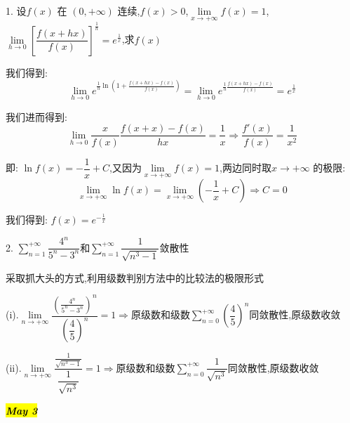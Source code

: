 1. 设$f(x)$ 在 $(0,+\infty)$ 连续,$f(x)>0$,$\lim\limits_{x\rightarrow  +\infty}f(x)=1$,$\lim\limits_{h\rightarrow 0}\left[\dfrac{f(x+hx)}{f(x)} \right]^{\frac{1}{h}}=e^{\frac{1}{x}} $,求$f(x)$
\begin{solution}
	
	我们得到: 
	$$\lim\limits_{h\rightarrow 0}e^{\frac{1}{h}\ln(1+\frac{f(x+hx)-f(x)}{f(x)})}=\lim\limits_{h\rightarrow 0}e^{\frac{1}{h}\frac{f(x+hx)-f(x)}{f(x)}}=e^{\frac{1}{x}}$$
	
	我们进而得到: 
	$$\lim\limits_{h\rightarrow 0}\frac{x}{f(x)}\frac{f(x+x)-f(x)}{hx}=\frac{1}{x}\Rightarrow \frac{f'(x)}{f(x)}=\frac{1}{x^2}$$
	
	即: $\ln f(x)=-\dfrac{1}{x}+C$,又因为$\lim\limits_{x\rightarrow  +\infty}f(x)=1$,两边同时取$x\rightarrow +\infty$ 的极限: 
	$$\lim\limits_{x\rightarrow +\infty}\ln f(x)=\lim\limits_{x\rightarrow +\infty}(-\frac{1}{x}+C)\Rightarrow C=0$$
	
	我们得到: $f(x)=e^{-\frac{1}{x}}$
\end{solution}

2. $\sum\limits_{n=1}^{+\infty}\dfrac{4^n}{5^n-3^n}$和$\sum\limits_{n=1}^{+\infty}\dfrac{1}{\sqrt{n^3-1}}$敛散性
\begin{solution}
	
	采取抓大头的方式,利用级数判别方法中的比较法的极限形式
	
	(i).$\lim\limits_{n\rightarrow+\infty}\dfrac{(\frac{4^n}{5^n-3^n})^n}{(\dfrac{4}{5})^n}=1\Rightarrow \text{原级数和级数}\sum\limits_{n=0}^{+\infty}(\dfrac{4}{5})^n\text{同敛散性}$,原级数收敛
	
	(ii).$\lim\limits_{n\rightarrow+\infty}\dfrac{\frac{1}{\sqrt{n^3-1}}}{\dfrac{1}{\sqrt{n^3}}}=1\Rightarrow \text{原级数和级数}\sum\limits_{n=0}^{+\infty}\dfrac{1}{\sqrt{n^3}}\text{同敛散性}$,原级数收敛
\end{solution}

\hl{\textbf{\textit{May 3}}}

